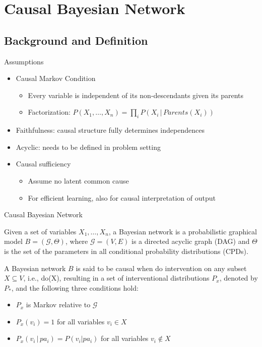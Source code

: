 \section{Causal Bayesian Network}
\subsection{Background and Definition}
\begin{frame}{Assumptions}
\begin{itemize}[<+->]
\item Causal Markov Condition
	\begin{itemize}
	\item Every variable is independent of its non-descendants given its parents
	\item Factorization: $P(X_1,\ldots,X_n)=\prod_iP(X_i\,|\,Parents(X_i))$
	\end{itemize}
\item Faithfulness: causal structure fully determines independences
\item Acyclic: needs to be defined in problem setting
\item Causal sufficiency
	\begin{itemize}
	\item Assume no latent common cause
	\item For efficient learning, also for causal interpretation of output
	\end{itemize}
\end{itemize}
\end{frame}
\begin{frame}{Causal Bayesian Network}
\begin{definition}
Given a set of variables ${X_1,\ldots, X_n}$, a Bayesian network is
a probabilistic graphical model $B = (\mathcal{G}, \Theta)$, where $\mathcal{G}=(V,E)$ is a
directed acyclic graph (DAG) and $\Theta$ is the set of the
parameters in all conditional probability distributions (CPDs).
\end{definition}
A Bayesian network $B$ is said to be causal when do intervention on any subset $X\subseteq V$, i.e., do(X), 
resulting in a set of interventional distributions $P_x$, denoted by $P_*$, and the following three conditions hold:
\begin{itemize}
\item $P_x$ is Markov relative to $\mathcal{G}$
\item $P_x(v_i)=1$ for all variables $v_i\in X$
\item $P_x(v_i\,|\,pa_i)=P(v_i|pa_i)$ for all variables $v_i\notin X$
\end{itemize} 
\end{frame}
